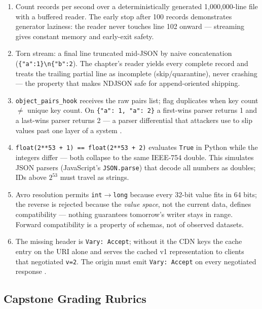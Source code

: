 \begin{enumerate}[label=\textbf{E4.\arabic*}, leftmargin=2.2em]
    $q=0.5$. Server score: html 0.7, json 0.5 --- html is served. The
    negotiation selector must confirm exactly this.
  \item Count records per second over a deterministically generated
    1{,}000{,}000-line file with a buffered reader. The early stop after 100
    records demonstrates generator laziness: the reader never touches line
    102 onward --- streaming gives constant memory and early-exit safety.
  \item Torn stream: a final line truncated mid-JSON by naive concatenation
    (\texttt{\{"a":1\}\textbackslash n\{"b":2}). The chapter's reader yields
    every complete record and treats the trailing partial line as
    incomplete (skip/quarantine), never crashing --- the property that makes
    NDJSON safe for append-oriented shipping.
  \item \texttt{object\_pairs\_hook} receives the raw pairs list; flag
    duplicates when key count $\neq$ unique key count. On
    \texttt{\{"a": 1, "a": 2\}} a first-wins parser returns 1 and a
    last-wins parser returns 2 --- a parser differential that attackers use
    to slip values past one layer of a system \cite{rfc8259}.
  \item \texttt{float(2**53 + 1) == float(2**53 + 2)} evaluates
    \texttt{True} in Python while the integers differ --- both collapse to
    the same IEEE-754 double. This simulates JSON parsers (JavaScript's
    \texttt{JSON.parse}) that decode all numbers as doubles; IDs above
    $2^{53}$ must travel as strings.
  \item Avro resolution permits \texttt{int}$\to$\texttt{long} because every
    32-bit value fits in 64 bits; the reverse is rejected because the
    \emph{value space}, not the current data, defines compatibility ---
    nothing guarantees tomorrow's writer stays in range. Forward
    compatibility is a property of schemas, not of observed datasets.
  \item The missing header is \texttt{Vary: Accept}; without it the CDN
    keys the cache entry on the URI alone and serves the cached v1
    representation to clients that negotiated \texttt{v=2}. The origin must
    emit \texttt{Vary: Accept} on every negotiated response
    \cite{rfc9110}.
\end{enumerate}

\subsection{Capstone Grading Rubrics}

